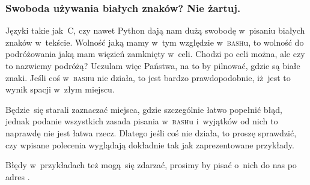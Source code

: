 \documentclass[10pt,t]{beamer}
\begin{document}
\begin{frame}
  \frametitle{Swoboda używania białych znaków? Nie żartuj.}


  Języki takie jak~C, czy nawet Python dają nam dużą swobodę
  w~pisaniu białych znaków w~tekście. Wolność jaką mamy w~tym względzie
  w~\textsc{bash}u, to wolność do podróżowania jaką mam więzień zamknięty
  w~celi. Chodzi po celi można, ale czy to nazwiemy podróżą? Uczulam więc
  Państwa, na to by pilnować, gdzie są białe znaki. Jeśli coś
  w~\textsc{bash}u nie działa, to jest bardzo prawdopodobnie, iż~jest to
  wynik spacji w~złym miejscu.

  Będzie~się starali zaznaczać miejsca, gdzie szczególnie łatwo popełnić
  błąd, jednak podanie wszystkich zasada pisania w~\textsc{bash}u i~wyjątków
  od nich to naprawdę nie jest łatwa rzecz. Dlatego jeśli coś nie działa,
  to proszę sprawdzić, czy wpisane polecenia wyglądają \alert{dokładnie}
  tak jak zaprezentowane przykłady.

  Błędy w~przykładach też mogą~się zdarzać, prosimy by pisać o~nich do nas
  po adres \email.

\end{frame}



















\printbibliography





\end{document}
